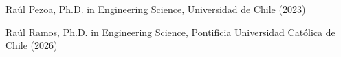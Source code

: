 \documentclass[10pt,a4paper]{article}
\newif\ifES
\newcommand{\tr}[2]{\ifES#2\else#1\fi}
\begin{document}
Raúl Pezoa, \tr{Ph.D. in Engineering Science}{Ph.D. en Ciencias de la Ingenier\'{i}a}, Universidad de Chile (2023) \medskip

Raúl Ramos, \tr{Ph.D. in Engineering Science}{Ph.D. en Ciencias de la Ingenier\'{i}a}, Pontificia Universidad Cat\'{o}lica de Chile (2026) \medskip

\end{document}
